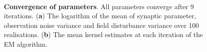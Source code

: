 \documentclass[]{article}
\begin{document}
\begin{figure}[!ht]
\centering
\\
\centering
{}
\caption{{\bf Convergence of parameters}. All parameters converge after 9 iterations. (\textbf a) The logarithm of the mean of synaptic parameter, observation noise variance and field disturbance variance over 100 realisations. (\textbf b) The mean kernel estimates at each iteration of the EM algorithm.}
\label{fig:ParameterConvergence}
\end{figure}
\end{document}
